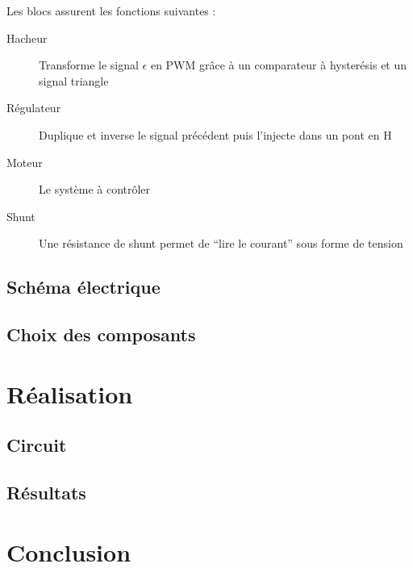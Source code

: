 \documentclass[a4paper]{article}
\begin{document}
Les blocs assurent les fonctions suivantes :
\begin{description}
  \item[Hacheur] 	Transforme le signal $\epsilon$ en PWM grâce à un comparateur à hysterésis et un signal triangle
  \item[Régulateur] Duplique et inverse le signal précédent puis l'injecte dans un pont en H
  \item[Moteur] 	Le système à contrôler
  \item[Shunt] 		Une résistance de shunt permet de “lire le courant” sous forme de tension
\end{description}

\subsection{Schéma électrique}

\subsection{Choix des composants}

\section{Réalisation}

\subsection{Circuit}

\subsection{Résultats}

\section{Conclusion}
\end{document}

